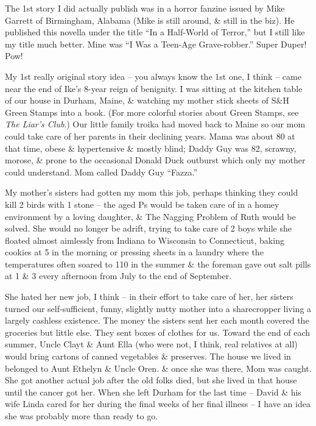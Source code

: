 \documentclass{article}
\numberwithin{equation}{section}
\begin{document}
 The 1st story I did actually publish was in a horror fanzine issued by Mike Garrett of Birmingham, Alabama (Mike is still around, \& still in the biz). He published this novella under the title ``In a Half-World of Terror,'' but I still like my title much better. Mine was ``I Was a Teen-Age Grave-robber.'' Super Duper! Pow!

 My 1st really original story idea -- you always know the 1st one, I think -- came near the end of Ike's 8-year reign of benignity. I was sitting at the kitchen table of our house in Durham, Maine, \& watching my mother stick sheets of S\&H Green Stamps into a book. (For more colorful stories about Green Stamps, see \textit{The Liar's Club}.) Our little family troika had moved back to Maine so our mom could take care of her parents in their declining years. Mama was about 80 at that time, obese \& hypertensive \& mostly blind; Daddy Guy was 82, scrawny, morose, \& prone to the occasional Donald Duck outburst which only my mother could understand. Mom called Daddy Guy ``Fazza.''

My mother's sisters had gotten my mom this job, perhaps thinking they could kill 2 birds with 1 stone -- the aged Ps would be taken care of in a homey environment by a loving daughter, \& The Nagging Problem of Ruth would be solved. She would no longer be adrift, trying to take care of 2 boys while she floated almost aimlessly from Indiana to Wisconsin to Connecticut, baking cookies at 5 in the morning or pressing sheets in a laundry where the temperatures often soared to 110 in the summer \& the foreman gave out salt pills at 1 \& 3 every afternoon from July to the end of September.

She hated her new job, I think -- in their effort to take care of her, her sisters turned our self-sufficient, funny, slightly nutty mother into a sharecropper living a largely cashless existence. The money the sisters sent her each month covered the groceries but little else. They sent boxes of clothes for us. Toward the end of each summer, Uncle Clayt \& Aunt Ella (who were not, I think, real relatives at all) would bring cartons of canned vegetables \& preserves. The house we lived in belonged to Aunt Ethelyn \& Uncle Oren. \& once she was there, Mom was caught. She got another actual job after the old folks died, but she lived in that house until the cancer got her. When she left Durham for the last time -- David \& his wife Linda cared for her during the final weeks of her final illness -- I have an idea she was probably more than ready to go.
\end{document}
